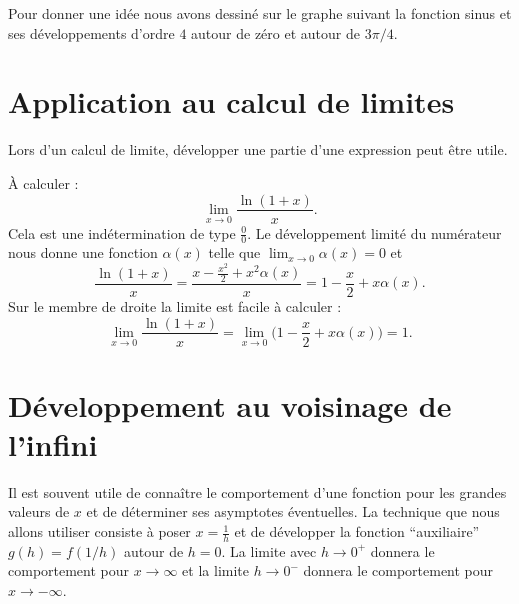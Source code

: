 Pour donner une idée nous avons dessiné sur le graphe suivant la fonction sinus et ses développements d'ordre \( 4\) autour de zéro et autour de \( 3\pi/4\).
\begin{center}
   
\end{center}


\section{Application au calcul de limites}

Lors d'un calcul de limite, développer une partie d'une expression peut être utile.

\begin{example}
    À calculer :
    \begin{equation}
        \lim_{x\to 0} \frac{ \ln(1+x) }{ x }.
    \end{equation}
    Cela est une indétermination de type \( \frac{ 0 }{ 0 }\). Le développement limité du numérateur nous donne une fonction \( \alpha(x)\) telle que \( \lim_{x\to 0} \alpha(x)=0\) et
    \begin{equation}
        \frac{ \ln(1+x) }{ x }=\frac{ x-\frac{ x^2 }{2}+x^2\alpha(x) }{ x }=1-\frac{ x }{ 2 }+x\alpha(x).
    \end{equation}
    Sur le membre de droite la limite est facile à calculer :
    \begin{equation}
        \lim_{x\to 0} \frac{ \ln(1+x) }{ x }=\lim_{x\to 0} \Big( 1-\frac{ x }{ 2 }+x\alpha(x) \Big) =1.
    \end{equation}
\end{example}

\section{Développement au voisinage de l'infini}

Il est souvent utile de connaître le comportement d'une fonction pour les grandes valeurs de \( x\) et de déterminer ses asymptotes éventuelles. La technique que nous allons utiliser consiste à poser \( x=\frac{1}{ h }\) et de développer la fonction ``auxiliaire'' $g(h) = f(1/h)$ autour de \( h=0\). La limite avec \( h\to 0^+\) donnera le comportement pour \( x\to \infty\) et la limite \( h\to 0^-\) donnera le comportement pour \( x\to -\infty\).

